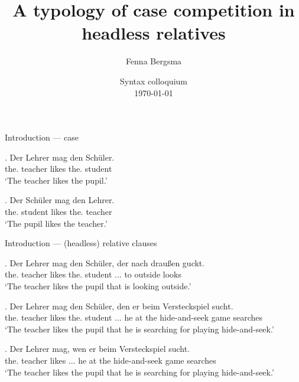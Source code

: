 \documentclass[xcolor=dvipsnames,10pt]{beamer}
\title{A typology of case competition in headless relatives}
\author{Fenna Bergsma}
\date{Syntax colloquium\\ \today}
\institute{Goethe-Universität Frankfurt}
\begin{document}
\begin{frame}
\titlepage

\end{frame}


\begin{frame}{Introduction --- case}

\exg. Der Lehrer mag den Schüler.\\
 the. teacher likes the. student\\
 `The teacher likes the pupil.'\label{ex:german-case-1}

\pause

\exg. Der Schüler mag den Lehrer.\\
 the. student likes the. teacher\\
 `The pupil likes the teacher.'\label{ex:german-case-2}

\end{frame}


\begin{frame}{Introduction --- (headless) relative clauses}

\exg. Der Lehrer mag den Schüler, der nach draußen guckt.\\
the. teacher likes the. student ... to outside looks\\
`The teacher likes the pupil that is looking outside.'\label{ex:german-relative-1}

\pause

\exg. Der Lehrer mag den Schüler, den er beim Versteckspiel sucht.\\
the. teacher likes the. student ... he {at the} {hide-and-seek game} searches\\
`The teacher likes the pupil that he is searching for playing hide-and-seek.'\label{ex:german-relative-2}

\pause

\exg. Der Lehrer mag, wen er beim Versteckspiel sucht.\\
the. teacher likes ... he {at the} {hide-and-seek game} searches\\
`The teacher likes the pupil that he is searching for playing hide-and-seek.'\label{ex:german-relative-2}

\end{frame}
\end{document}
